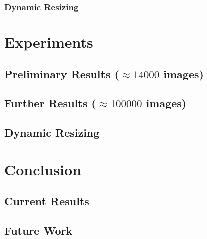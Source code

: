\documentclass[11pt]{amsart}
\begin{document}
\subsubsection{Dynamic Resizing}

\section{Experiments}

\subsection{Preliminary Results ($\approx14000$ images)}

\subsection{Further Results ($\approx100000$ images)} 

\subsection{Dynamic Resizing}

\section{Conclusion}

\subsection{Current Results}

\subsection{Future Work}



\end{document}
